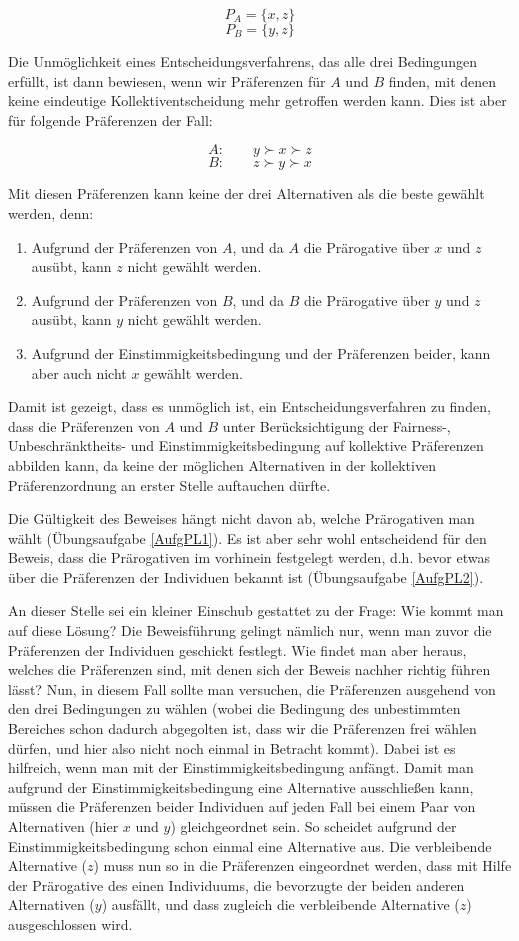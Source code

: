 \[P_A = \{x,z\} \]
\[P_B = \{y,z\} \]

Die Unmöglichkeit eines Entscheidungsverfahrens, das alle drei Bedingungen
erfüllt, ist dann bewiesen, wenn wir Präferenzen für $A$ und $B$ finden, mit
denen keine eindeutige Kollektiventscheidung mehr getroffen werden kann.
Dies ist aber für folgende Präferenzen der Fall:

\[A:\qquad y \succ x \succ z \]
\[B:\qquad z \succ y \succ x \]

Mit diesen Präferenzen kann keine der drei Alternativen als die beste
gewählt werden, denn: 
\begin{enumerate}
  \item Aufgrund der Präferenzen von $A$, und da $A$ die
  Prärogative über $x$ und $z$ ausübt, kann $z$ nicht gewählt werden.
  \item Aufgrund der Präferenzen von $B$, und da $B$ die Prärogative
  über $y$ und $z$ ausübt, kann $y$ nicht gewählt werden.
  \item Aufgrund der Einstimmigkeitsbedingung und der Präferenzen beider, kann
  aber auch nicht $x$ gewählt werden.  
\end{enumerate}
Damit ist gezeigt, dass es unmöglich ist, ein Entscheidungsverfahren zu finden,
dass die Präferenzen von $A$ und $B$ unter Berücksichtigung der Fairness-,
Unbeschränktheits- und Einstimmigkeitsbedingung auf kollektive Präferenzen
abbilden kann, da keine der möglichen Alternativen in der kollektiven
Präferenzordnung an erster Stelle auftauchen dürfte.

Die Gültigkeit des Beweises hängt nicht davon ab, welche Prärogativen man wählt
(Übungsaufgabe \ref{AufgPL1}). Es ist aber sehr wohl entscheidend für den
Beweis, dass die Prärogativen im vorhinein festgelegt werden, d.h. bevor etwas über die
Präferenzen der Individuen bekannt ist (Übungsaufgabe \ref{AufgPL2}).

An dieser Stelle sei ein kleiner Einschub gestattet zu der
Frage: Wie kommt man auf diese Lösung? Die Beweisführung gelingt nämlich nur, wenn man
zuvor die Präferenzen der Individuen geschickt festlegt. Wie findet man aber
heraus, welches die Präferenzen sind, mit denen sich der Beweis nachher richtig
führen lässt? Nun, in diesem Fall sollte man versuchen, die Präferenzen
ausgehend von den drei Bedingungen zu wählen (wobei die Bedingung des
unbestimmten Bereiches schon dadurch abgegolten ist, dass wir die Präferenzen
frei wählen dürfen, und hier also nicht noch einmal in Betracht kommt). Dabei
ist es hilfreich, wenn man mit der Einstimmigkeitsbedingung anfängt. Damit man 
aufgrund der Einstimmigkeitsbedingung eine Alternative ausschließen kann, müssen
die Präferenzen beider Individuen auf jeden Fall bei einem Paar von Alternativen
(hier $x$ und $y$) gleichgeordnet sein. So scheidet aufgrund der
Einstimmigkeitsbedingung schon einmal eine Alternative aus. 
Die verbleibende Alternative ($z$) muss nun so in die Präferenzen eingeordnet werden, 
dass mit Hilfe der Prärogative des einen Individuums, die bevorzugte der beiden
anderen Alternativen ($y$) ausfällt, und dass zugleich die verbleibende
Alternative ($z$) ausgeschlossen wird.

